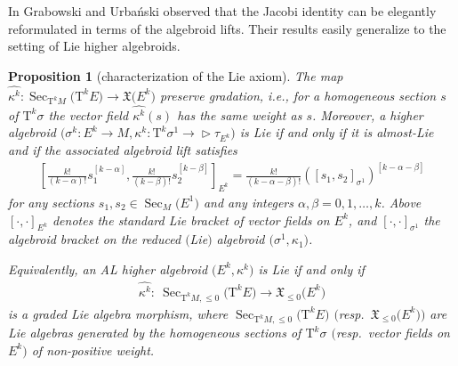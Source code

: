 \documentclass[pdftex]{sigma}
\newcommand{\wh}[1]{\widehat{#1}} %
\newcommand{\Sec}{\operatorname{Sec}}
\newcommand{\X}{\mathfrak{X}}
\newcommand{\ra}{\rightarrow}
\newcommand{\TT}[1]{\mathrm{T}^{#1}} %
\def\relto{\rightarrow\!\!\vartriangleright} %
\numberwithin{equation}{section}
\newtheorem{prop}[thm]{Proposition}
\theoremstyle{definition}
\begin{document}
In \cite{JG_PU_Lie_alg_P-N_str_1997} Grabowski and Urba\'nski observed that the Jacobi identity can be elegantly reformulated in terms of the algebroid lifts. Their results easily generalize to the setting of Lie higher algebroids.
\begin{prop}[characterization of the Lie axiom]\label{prop:Lie_HA}
 The map $\wh{\kappa^k}\colon \Sec_{\TT{k}M} \big(\TT{k} E\big)\ra \X\big(E^k\big)$ preserve gradation, i.e., for a homogeneous section $s$ of $\TT{k} \sigma$ the vector field $\wh{ \kappa^k}(s)$ has the same weight as $s$. Moreover, a
higher algebroid $\big(\sigma^k\colon E^k\ra M,\kappa^k\colon \TT{k}\sigma^1\relto\tau_{E^k}\big)$ is Lie if and only if it is almost-Lie and if the associated algebroid lift satisfies
\begin{gather}\label{eqn:Lie_HA}
\left[\frac{k!}{(k-\alpha)!} s_1^{[k-\alpha]}, \frac{k!}{(k-\beta)!}s_2^{[k-\beta]}\right]_{E^k}=\frac{k!}{(k-\alpha-\beta)!}([s_1,s_2]_{\sigma^1})^{[k-\alpha-\beta]}
\end{gather}
for any sections $s_1,s_2\in\Sec_M\big(E^1\big)$ and any integers $\alpha,\beta=0,1,\hdots,k$. Above $[\cdot,\cdot]_{E^k}$ denotes the standard Lie bracket of vector fields on $E^k$, and $[\cdot,\cdot]_{\sigma^1}$ the algebroid bracket on the reduced $($Lie$)$ algebroid $\big(\sigma^1,\kappa_1\big)$.

Equivalently, an AL higher algebroid $\big(E^k, \kappa^k\big)$ is Lie if and only if
\begin{gather}\label{eqn:Lie_HA_leq0}
\wh{\kappa^k}\colon \ \Sec_{\TT{k} M, \leq0}\big(\TT{k} E\big) \ra \X_{\leq0}\big(E^k\big)
\end{gather}
is a graded Lie algebra morphism, where $\Sec_{\TT{k} M, \leq0}\big(\TT{k} E\big)$ $($resp.~$\X_{\leq0}\big(E^k\big))$ are Lie algebras generated by the homogeneous sections of $\TT{k}\sigma$ $($resp.\ vector fields on $E^k)$ of non-positive weight.
\end{prop}
\end{document}
